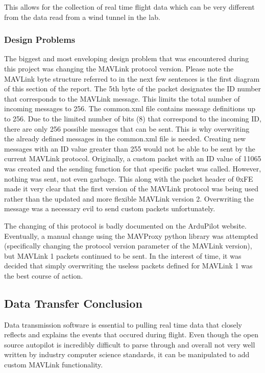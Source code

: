 \documentclass[12pt,journal,compsoc]{IEEEtran}
\begin{document}
This allows for the collection of real time flight data which can be very different from the data read from a wind tunnel in the lab. 

\subsubsection{Design Problems}
The biggest and most enveloping design problem that was encountered during this project was changing the MAVLink protocol version. Please note the MAVLink byte structure referred to in the next few sentences is the first diagram of this section of the report. The 5th byte of the packet designates the ID number that corresponds to the MAVLink message. This limits the total number of incoming messages to 256. The common.xml file contains message definitions up to 256. Due to the limited number of bits (8) that correspond to the incoming ID, there are only 256 possible messages that can be sent. This is why overwriting the already defined messages in the common.xml file is needed. Creating new messages with an ID value greater than 255 would not be able to be sent by the current MAVLink protocol. Originally, a custom packet with an ID value of 11065 was created and the sending function for that specific packet was called. However, nothing was sent, not even garbage. This along with the packet header of 0xFE made it very clear that the first version of the MAVLink protocol was being used rather than the updated and more flexible MAVLink version 2. Overwriting the message was a necessary evil to send custom packets unfortunately. 

The changing of this protocol is badly documented on the ArduPilot website. Eventually, a manual change using the MAVProxy python library was attempted (specifically changing the protocol version parameter of the MAVLink version), but MAVLink 1 packets continued to be sent. In the interest of time, it was decided that simply overwriting the useless packets defined for MAVLink 1 was the best course of action.

\subsection{Data Transfer Conclusion}
Data transmission software is essential to pulling real time data that closely reflects and explains the events that occured during flight. Even though the open source autopilot is incredibly difficult to parse through and overall not very well written by industry computer science standards, it can be manipulated to add custom MAVLink functionality. 
\end{document}
